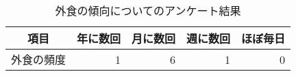 \begin{table}[H]
\centering
\caption{外食の傾向についてのアンケート結果}
\label{table:questionnaire:frequency}
\small
\begin{tabular}{|c|r|r|r|r|}
\hline
項目 & 年に数回 & 月に数回 & 週に数回 & ほぼ毎日 \\ \hline
外食の頻度 & 1 & 6 & 1 & 0 \\ \hline
\end{tabular}
\end{table}
